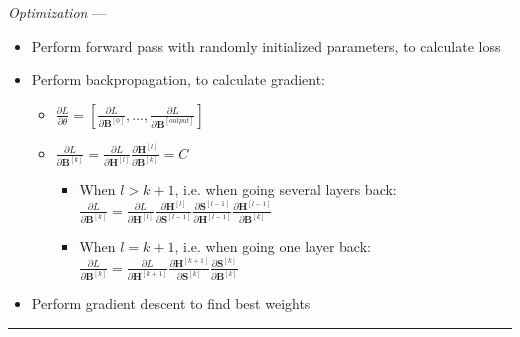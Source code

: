 \emph{Optimization} ---
\begin{itemize}
    \item Perform forward pass with randomly initialized parameters, to calculate loss
    \item Perform backpropagation, to calculate gradient:
    \begin{itemize}
        \item $\frac{\partial L}{\partial \theta} = [ \frac{\partial L}{\partial \boldsymbol{B}^{[0]}} , ..., \frac{\partial L}{\partial \boldsymbol{B}^{[output]}} ]$
        \item $\frac{\partial L}{\partial \boldsymbol{B}^{[k]} } = \frac{\partial L}{ \partial \boldsymbol{H}^{[l]} } \frac{ \partial \boldsymbol{H}^{[l]} }{ \partial \boldsymbol{B}^{[k]} } = C$
        \begin{itemize}
            \item When $l > k+1$, i.e. when going several layers back: $\frac{\partial L}{\partial \boldsymbol{B}^{[k]} } = \frac{\partial L}{ \partial \boldsymbol{H}^{[l]} }  \frac{ \partial \boldsymbol{H}^{[l]} }{ \partial \boldsymbol{S}^{[l-1]} } \frac{ \partial \boldsymbol{S}^{[l-1]} }{ \partial \boldsymbol{H}^{[l-1]} } \frac{ \partial \boldsymbol{H}^{[l-1]} }{ \partial \boldsymbol{B}^{[k]} }$ 
            \item When $l = k+1$, i.e. when going one layer back: $\frac{\partial L}{\partial \boldsymbol{B}^{[k]} } = \frac{\partial L}{ \partial \boldsymbol{H}^{[k+1]} }  \frac{ \partial \boldsymbol{H}^{[k+1]} }{ \partial \boldsymbol{S}^{[k]} } \frac{ \partial \boldsymbol{S}^{[k]} }{ \partial \boldsymbol{B}^{[k]} }$
        \end{itemize}
    \end{itemize}
    \item Perform gradient descent to find best weights 
\end{itemize}

{\color{lightgray}\hrule height 0.001mm}

